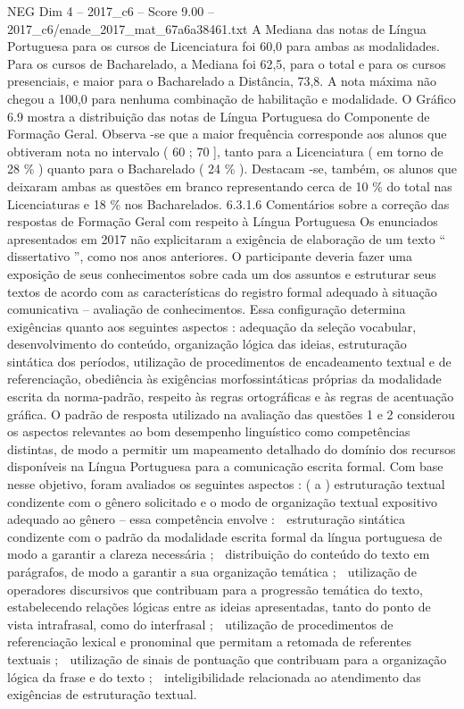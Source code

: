 \begin{textsample}{NEG Dim 4 – 2017\_c6 – Score 9.00 – 2017\_c6/enade\_2017\_mat\_67a6a38461.txt}
A Mediana das notas de Língua Portuguesa para os cursos de Licenciatura foi 60,0 para ambas as modalidades.
Para os cursos de Bacharelado, a Mediana foi 62,5, para o total e para os cursos presenciais, e maior para o Bacharelado a Distância, 73,8.
A nota máxima não chegou a 100,0 para nenhuma combinação de habilitação e modalidade.
O Gráfico 6.9 mostra a distribuição das notas de Língua Portuguesa do Componente de Formação Geral.
Observa -se que a maior frequência corresponde aos alunos que obtiveram nota no intervalo ( 60 ; 70 ], tanto para a Licenciatura ( em torno de 28 \% ) quanto para o Bacharelado ( 24 \% ).
Destacam -se, também, os alunos que deixaram ambas as questões em branco representando cerca de 10 \% do total nas Licenciaturas e 18 \% nos Bacharelados. 6.3.1.6 Comentários sobre a correção das respostas de Formação Geral com respeito à Língua Portuguesa Os enunciados apresentados em 2017 não explicitaram a exigência de elaboração de um texto “ dissertativo ”, como nos anos anteriores.
O participante deveria fazer uma exposição de seus conhecimentos sobre cada um dos assuntos e estruturar seus textos de acordo com as características do registro formal adequado à situação comunicativa – avaliação de conhecimentos.
Essa configuração determina exigências quanto aos seguintes aspectos : adequação da seleção vocabular, desenvolvimento do conteúdo, organização lógica das ideias, estruturação sintática dos períodos, utilização de procedimentos de encadeamento textual e de referenciação, obediência às exigências morfossintáticas próprias da modalidade escrita da norma-padrão, respeito às regras ortográficas e às regras de acentuação gráfica.
O padrão de resposta utilizado na avaliação das questões 1 e 2 considerou os aspectos relevantes ao bom desempenho linguístico como competências distintas, de modo a permitir um mapeamento detalhado do domínio dos recursos disponíveis na Língua Portuguesa para a comunicação escrita formal.
Com base nesse objetivo, foram avaliados os seguintes aspectos : ( a ) estruturação textual condizente com o gênero solicitado e o modo de organização textual expositivo adequado ao gênero – essa competência envolve :  estruturação sintática condizente com o padrão da modalidade escrita formal da língua portuguesa de modo a garantir a clareza necessária ;  distribuição do conteúdo do texto em parágrafos, de modo a garantir a sua organização temática ;  utilização de operadores discursivos que contribuam para a progressão temática do texto, estabelecendo relações lógicas entre as ideias apresentadas, tanto do ponto de vista intrafrasal, como do interfrasal ;  utilização de procedimentos de referenciação lexical e pronominal que permitam a retomada de referentes textuais ;  utilização de sinais de pontuação que contribuam para a organização lógica da frase e do texto ;  inteligibilidade relacionada ao atendimento das exigências de estruturação textual.

\end{textsample}
